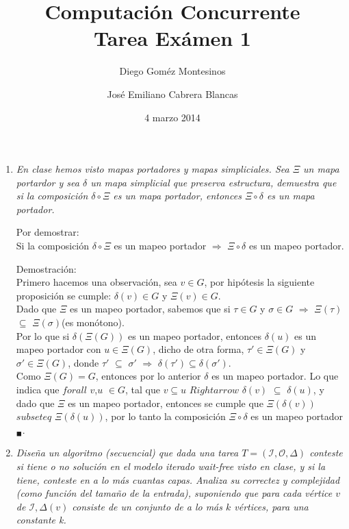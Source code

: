 \documentclass{article}
\title{Computación Concurrente \\ \Large{Tarea Exámen 1}}
\author{
  Diego Goméz Montesinos
  \and
  José Emiliano Cabrera Blancas
  }
\date{4 marzo 2014}
\begin{document}
\maketitle
\begin{enumerate}
  
\item{
    \textsl{
      En clase hemos visto mapas portadores y mapas simpliciales. Sea $\Xi$ un
      mapa portardor y sea $\delta$ un mapa simplicial que preserva estructura,
      demuestra que si la composición $\delta \circ \Xi$ es un mapa portador, 
      entonces $\Xi \circ \delta$ es un mapa portador.\\
    }
    
    Por demostrar:\\
    Si la composición $\delta \circ \Xi$ es un mapeo portador $\Rightarrow$ 
    $\Xi \circ \delta$ es un mapeo portador.
    
    Demostración:\\
    Primero hacemos una observación, sea $v \in G$, por hipótesis la siguiente 
    proposición se cumple: $\delta(v) \in G$ y $\Xi(v) \in G$.\\
    Dado que $\Xi$ es un mapeo portador, sabemos que si $\tau \in G$ y 
    $\sigma \in G$ $\Rightarrow$ $\Xi(\tau)$ $\subseteq$ $\Xi(\sigma)$(es monótono).\\
    Por lo que si $\delta(\Xi(G))$ es un mapeo portador, entonces $\delta(u)$ es un
    mapeo portador con $u \in \Xi(G)$, dicho de otra forma, $\tau' \in \Xi(G)$ y 
    $\sigma' \in \Xi(G)$, donde $\tau'$ $\subseteq$ $\sigma'$ $\Rightarrow$ $\delta(\tau') 
    \subseteq \delta(\sigma')$.\\
    Como $\Xi(G) = G$, entonces por lo anterior $\delta$ es un mapeo portador.
    Lo que indica que $forall$ $v$,$u$ $\in G$, tal que $v \subseteq u$ $Rightarrow$ 
    $\delta(v)$ $\subseteq$ $\delta(u)$, y dado que $\Xi$ es un mapeo portador, entonces
    se cumple que $\Xi(\delta(v))$ $subseteq$ $\Xi(\delta(u))$, por lo tanto la composición
    $\Xi \circ \delta$ es un mapeo portador $_\blacksquare$.\\
        
  }
  
\item{
    \textsl{ 
      Diseña un algoritmo (secuencial) que dada una tarea $T = (\mathcal{I},\mathcal{O},\Delta)$
      conteste si tiene o no solución en el modelo iterado wait-free visto en clase, y si la tiene,
      conteste en a lo más cuantas capas. Analiza su correctez y complejidad (como función del tamaño
      de la entrada), suponiendo que para cada vértice $v$ de $\mathcal{I},\Delta(v)$ consiste de 
      un conjunto de a lo más $k$ vértices, para una constante k.
    }

}
\end{enumerate}
\end{document}
